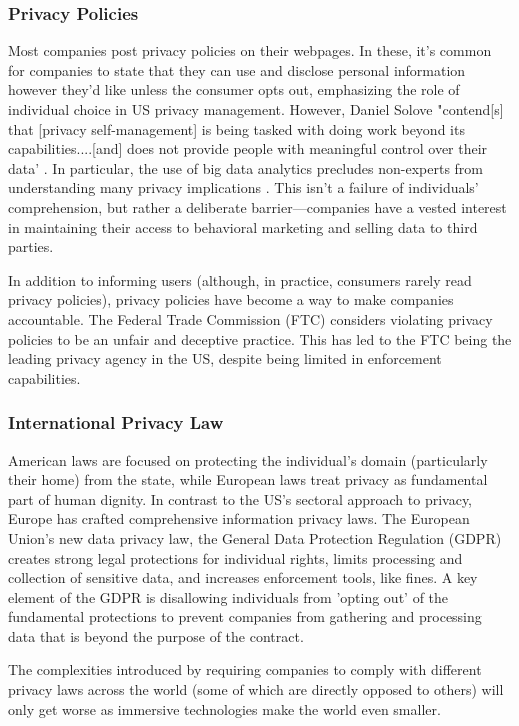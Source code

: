 \subsubsection{Privacy Policies}

Most companies post privacy policies on their webpages. In these, it's common for companies to state that they can use and disclose personal information however they'd like unless the consumer opts out, emphasizing the role of individual choice in US privacy management. However, Daniel Solove "contend[s] that [privacy self-management] is being tasked with doing work beyond its capabilities....[and] does not provide people with meaningful control over their data' \cite{solove2012introduction}. In particular, the use of big data analytics precludes non-experts from understanding many privacy implications \cite{baruh2017big}. This isn't a failure of individuals' comprehension, but rather a deliberate barrier---companies have a vested interest in maintaining their access to behavioral marketing and selling data to third parties.

In addition to informing users (although, in practice, consumers rarely read privacy policies), privacy policies have become a way to make companies accountable. The Federal Trade Commission (FTC) considers violating privacy policies to be an unfair and deceptive practice. This has led to the FTC being the leading privacy agency in the US, despite being limited in enforcement capabilities.

\subsubsection{International Privacy Law}

American laws are focused on protecting the individual's domain (particularly their home) from the state, while European laws treat privacy as fundamental part of human dignity.
In contrast to the US's sectoral approach to privacy, Europe has crafted comprehensive information privacy laws. The European Union's new data privacy law, the General Data Protection Regulation (GDPR) creates strong legal protections for individual rights, limits processing and collection of sensitive data, and increases enforcement tools, like fines. A key element of the GDPR is disallowing individuals from 'opting out' of the fundamental protections to prevent companies from gathering and processing data that is beyond the purpose of the contract.

The complexities introduced by requiring companies to comply with different privacy laws across the world (some of which are directly opposed to others) will only get worse as immersive technologies make the world even smaller.

